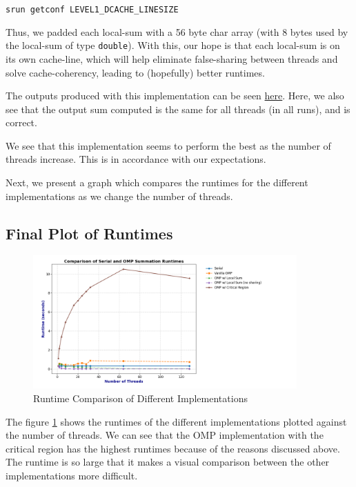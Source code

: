 \documentclass[a4paper,10pt]{article}
\begin{document}
\begin{center}
\verb|srun getconf LEVEL1_DCACHE_LINESIZE|
\end{center}

Thus, we padded each local-sum with a 56 byte char array (with 8 bytes used by the local-sum of type \verb|double|).  With this, our hope is that each local-sum is on its own cache-line, which will help eliminate false-sharing between threads and solve cache-coherency, leading to (hopefully) better runtimes. 

The outputs produced with this implementation can be seen \href{https://github.com/paulmyr/DD2356-MethodsHPC/blob/master/3_open_mp/exercise3/outputs/omp_local_no_sharing_output.txt}{here}. Here, we also see that the output sum computed is the same for all threads (in all runs), and is correct. 

We see that this implementation seems to perform the best as the number of threads increase. This is in accordance with our expectations. 

Next, we present a graph which compares the runtimes for the different implementations as we change the number of threads.

\subsection{Final Plot of Runtimes}

\begin{figure}[H]
  \centering
  \includegraphics[width=0.9\textwidth]{img/ex3/ex3_comparison_all.png}
  \caption{Runtime Comparison of Different Implementations}
  \label{fig:ex3_runtime_all}
\end{figure}


The figure \ref{fig:ex3_runtime_all} shows the runtimes of the different implementations plotted against the number of threads. We can see that the OMP implementation with the critical region has the highest runtimes because of the reasons discussed above. The runtime is so large that it makes a visual comparison between the other implementations more difficult. 
\end{document}
